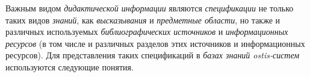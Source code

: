 Важным видом \textit{дидактической информации} являются \textit{спецификации} не только таких видов \textit{знаний}, как \textit{высказывания} и \textit{предметные области}, но также и различных используемых \textit{библиографических источников} и \textit{информационных ресурсов} (в том числе и различных разделов этих источников и информационных ресурсов). Для представления таких спецификаций в \textit{базах знаний ostis-систем} используются следующие понятия.

\begin{SCn}
\end{SCn}

\vspace{-\baselineskip}

\begin{SCn}
\end{SCn}

\vspace{-\baselineskip}

\begin{SCn}
\end{SCn}

\vspace{-\baselineskip}

\begin{SCn}
\end{SCn}

\vspace{-\baselineskip}

\begin{SCn}
\end{SCn}

\vspace{-\baselineskip}

\begin{SCn}
\end{SCn}

\vspace{-\baselineskip}

\begin{SCn}
\end{SCn}

\vspace{-\baselineskip}

